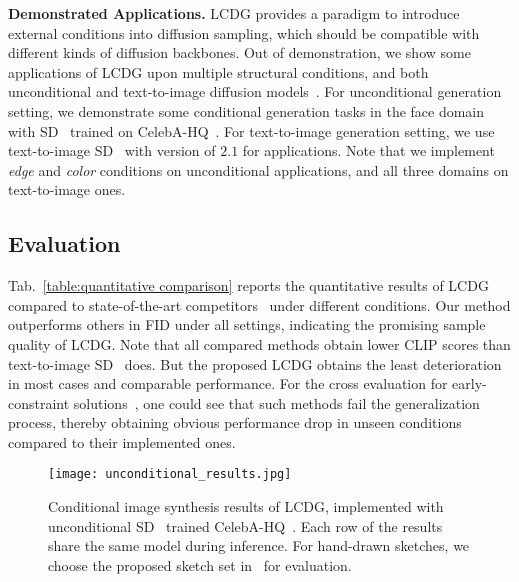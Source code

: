 \documentclass{article}
\begin{document}
\textbf{Demonstrated Applications.} LCDG provides a paradigm to introduce external conditions into diffusion sampling, which should be compatible with different kinds of diffusion backbones. Out of demonstration, we show some applications of LCDG upon multiple structural conditions, and both unconditional and text-to-image diffusion models~\cite{rombach2022high}. For unconditional generation setting, we demonstrate some conditional generation tasks in the face domain with SD~\cite{rombach2022high} trained on CelebA-HQ~\cite{karras2017progressive}. For text-to-image generation setting, we use text-to-image SD~\cite{rombach2022high} with version of $2.1$ for applications. Note that we implement \textit{edge} and \textit{color} conditions on unconditional applications, and all three domains on text-to-image ones.

\subsection{Evaluation}



Tab.~\ref{table:quantitative comparison} reports the quantitative results of LCDG compared to state-of-the-art competitors~\cite{wang2022pretraining, zhang2023adding, mou2023t2i, rombach2022high} under different conditions. Our method outperforms others in FID \cite{NIPS2017_8a1d6947} under all settings, indicating the promising sample quality of LCDG. Note that all compared methods obtain lower CLIP scores than text-to-image SD~\cite{rombach2022high} does. But the proposed LCDG obtains the least deterioration in most cases and comparable performance. For the cross evaluation for early-constraint solutions~\cite{rombach2022high,mou2023t2i}, one could see that such methods fail the generalization process, thereby obtaining obvious performance drop in unseen conditions compared to their implemented ones.

\begin{figure*}[t!]
  \centering
  \texttt{[image: unconditional\_results.jpg]} \vspace{-1em}
  \caption{Conditional image synthesis results of LCDG, implemented with unconditional SD~\cite{rombach2022high} trained CelebA-HQ~\cite{karras2017progressive}. Each row of the results share the same model during inference. For hand-drawn sketches, we choose the proposed sketch set in~\cite{yang2020deep} for evaluation.}
  \label{figure:unconditional results}
  \vspace{-0.5em}  
\end{figure*}
  
\end{document}
